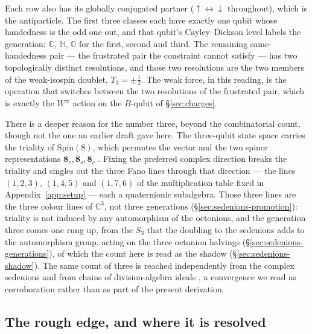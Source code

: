 Each row also has its globally conjugated partner ($\uparrow\!\leftrightarrow\!\downarrow$
throughout), which is the antiparticle. The first three classes each have exactly one qubit whose
handedness is the odd one out, and that qubit's Cayley--Dickson level labels the generation:
$\mathbb{C}$, $\mathbb{H}$, $\mathbb{O}$ for the first, second and third. The remaining
same-handedness pair --- the frustrated pair the constraint cannot satisfy --- has two topologically
distinct resolutions, and those two resolutions are the two members of the weak-isospin doublet,
$T_3 = \pm\tfrac12$. The weak force, in this reading, is the operation that switches between the two
resolutions of the frustrated pair, which is exactly the $W^\pm$ action on the $B$-qubit of
\S\ref{sec:charges}.

There is a deeper reason for the number three, beyond the combinatorial count, though not the
one an earlier draft gave here. The three-qubit state space carries the triality of
$\mathrm{Spin}(8)$, which permutes the vector and the two spinor representations $\mathbf{8}_v,
\mathbf{8}_s, \mathbf{8}_c$ \autocite{baez2002octonions}. Fixing the preferred complex direction
breaks the triality and singles out the three Fano lines through that direction --- the lines
$(1,2,3)$, $(1,4,5)$ and $(1,7,6)$ of the multiplication table fixed in Appendix~\ref{app:setup}
--- each a quaternionic subalgebra. Those three lines are the three colour lines of
$\mathbb{C}^3$, not three generations (\S\ref{sec:sedenions-promotion}): triality is not induced
by any automorphism of the octonions, and the generation three comes one rung up, from the $S_3$
that the doubling to the sedenions adds to the automorphism group, acting on the three octonion
halvings (\S\ref{sec:sedenions-generations}), of which the count here is read as the shadow
(\S\ref{sec:sedenions-shadow}). The same count of three is reached independently from the
complex sedenions and from chains of division-algebra ideals
\autocite{gillardgresnigt2019three,furey2018three}, a convergence we read as corroboration
rather than as part of the present derivation.


\subsection{The rough edge, and where it is resolved}
\label{sec:sedenion-announcement}

